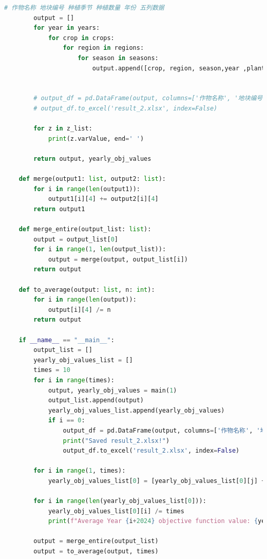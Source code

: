 \documentclass[withoutpreface]{cumcmthesis}
\begin{document}
\begin{appendices}
\begin{lstlisting}[language=python]
        # 作物名称 地块编号 种植季节 种植数量 年份 五列数据
        output = []
        for year in years:
            for crop in crops:
                for region in regions:
                    for season in seasons:
                        output.append([crop, region, season,year ,planting_area[(crop, region, year, season)].varValue])
    
    
        # output_df = pd.DataFrame(output, columns=['作物名称', '地块编号', '种植季节','年份', '种植数量'])
        # output_df.to_excel('result_2.xlsx', index=False)
    
        for z in z_list:
            print(z.varValue, end=' ')
    
        return output, yearly_obj_values
    
    def merge(output1: list, output2: list):
        for i in range(len(output1)):
            output1[i][4] += output2[i][4]
        return output1
    
    def merge_entire(output_list: list):
        output = output_list[0]
        for i in range(1, len(output_list)):
            output = merge(output, output_list[i])
        return output
    
    def to_average(output: list, n: int):
        for i in range(len(output)):
            output[i][4] /= n
        return output
    
    if __name__ == "__main__":
        output_list = []
        yearly_obj_values_list = []
        times = 10
        for i in range(times):
            output, yearly_obj_values = main(1)
            output_list.append(output)
            yearly_obj_values_list.append(yearly_obj_values)
            if i == 0:
                output_df = pd.DataFrame(output, columns=['作物名称', '地块编号', '种植季节','年份', '种植数量'])
                print("Saved result_2.xlsx!")
                output_df.to_excel('result_2.xlsx', index=False)
    
        for i in range(1, times):
            yearly_obj_values_list[0] = [yearly_obj_values_list[0][j] + yearly_obj_values_list[i][j] for j in range(len(yearly_obj_values_list[0]))]
        
        for i in range(len(yearly_obj_values_list[0])):
            yearly_obj_values_list[0][i] /= times
            print(f"Average Year {i+2024} objective function value: {yearly_obj_values_list[0][i]}")
    
        output = merge_entire(output_list)
        output = to_average(output, times)
    

\end{lstlisting}
\end{appendices}
\end{document}
